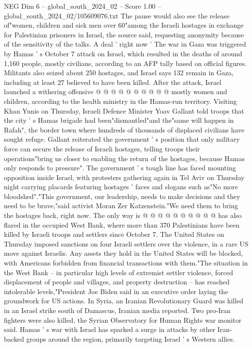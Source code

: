 \begin{textsample}{NEG Dim 6 – global\_south\_2024\_02 – Score 1.00 – global\_south\_2024\_02/105609076.txt}
The pause would also see the release of"women, children and sick men over 60"among the Israeli hostages in exchange for Palestinian prisoners in Israel, the source said, requesting anonymity because of the sensitivity of the talks.
A deal ' right now ' The war in Gaza was triggered by Hamas ' s October 7 attack on Israel, which resulted in the deaths of around 1,160 people, mostly civilians, according to an AFP tally based on official figures.
Militants also seized about 250 hostages, and Israel says 132 remain in Gaza, including at least 27 believed to have been killed.
After the attack, Israel launched a withering offensive @ @ @ @ @ @ @ @ @ @ mostly women and children, according to the health ministry in the Hamas-run territory.
Visiting Khan Yunis on Thursday, Israeli Defence Minister Yoav Gallant told troops that the city ' s Hamas brigade had been"dismantled"and the"same will happen in Rafah", the border town where hundreds of thousands of displaced civilians have sought refuge.
Gallant reiterated the government ' s position that only military force can secure the release of Israeli hostages, telling troops their operations"bring us closer to enabling the return of the hostages, because Hamas only responds to pressure".
The government ' s tough line has faced mounting opposition inside Israel, with protesters gathering again in Tel Aviv on Thursday night carrying placards featuring hostages ' faces and slogans such as"No more bloodshed"."This government, our leadership, needs to make decisions and they need to be brave,"said activist Moran Zer Katzenstein."We need them to bring the hostages back, right now.
The only way is @ @ @ @ @ @ @ @ @ @ has also flared in the occupied West Bank, where more than 370 Palestinians have been killed by Israeli troops and settlers since October 7.
The United States on Thursday imposed sanctions on four Israeli settlers over the violence, in a rare US move against Israelis.
Any assets they hold in the United States will be blocked, with Americans forbidden from financial transactions with them."The situation in the West Bank -- in particular high levels of extremist settler violence, forced displacement of people and villages, and property destruction -- has reached intolerable levels,"President Joe Biden said in an executive order laying the groundwork for US actions.
In Syria, an Iranian Revolutionary Guard was killed in an Israel strike south of Damascus, Iranian media reported.
Two pro-Iran fighters were also killed, the Syrian Observatory for Human Rights war monitor said.
Hamas ' s war with Israel has sparked a surge in attacks by other Iran-backed groups around the region, primarily targeting Israel ' s Western allies.

\end{textsample}

